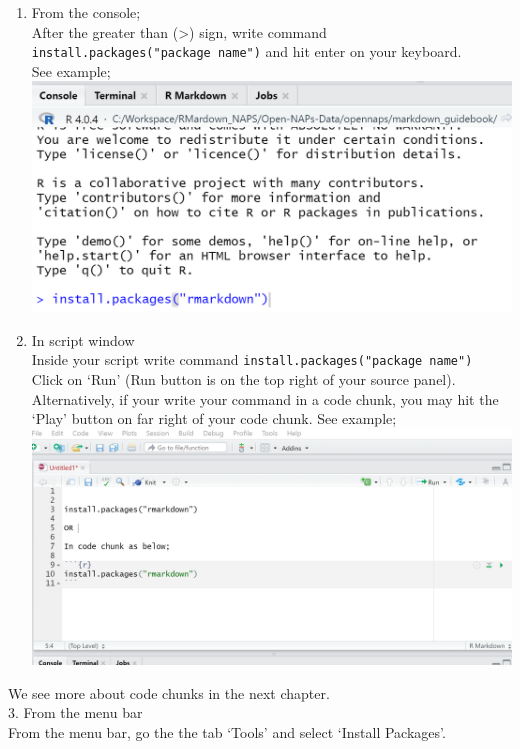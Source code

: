 \documentclass[
]{book}
\providecommand{\tightlist}{%
  \setlength{\itemsep}{0pt}\setlength{\parskip}{0pt}}
\begin{document}
\begin{enumerate}
\def\labelenumi{\arabic{enumi}.}
\tightlist
\item
  From the console;\\
  After the greater than (\textgreater) sign, write command \texttt{install.packages("package\ name")} and hit enter on your keyboard.\\
  See example;\\
  \includegraphics{tutorial_screenshots/install_rmkdn_consl.png}\\
\item
  In script window\\
  Inside your script write command \texttt{install.packages("package\ name")}\\
  Click on `Run' (Run button is on the top right of your source panel).\\
  Alternatively, if your write your command in a code chunk, you may hit the `Play' button on far right of your code chunk. See example;\\
  \includegraphics{tutorial_screenshots/install_rmkdn_scrpt.png}
\end{enumerate}

We see more about code chunks in the next chapter.\\
3. From the menu bar\\
From the menu bar, go the the tab `Tools' and select `Install Packages'.
\end{document}
